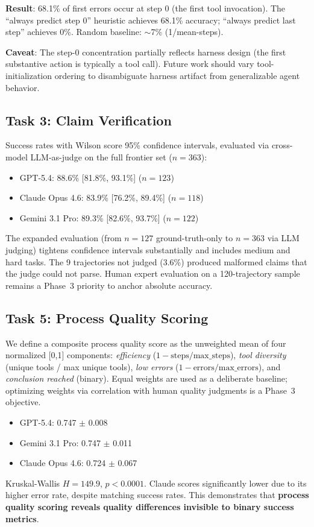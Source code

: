 \documentclass{article}
\begin{document}
\textbf{Result}: 68.1\% of first errors occur at step 0 (the first tool invocation). The ``always predict step 0'' heuristic achieves 68.1\% accuracy; ``always predict last step'' achieves 0\%. Random baseline: ${\sim}$7\% (1/mean-steps).

\textbf{Caveat}: The step-0 concentration partially reflects harness design (the first substantive action is typically a tool call). Future work should vary tool-initialization ordering to disambiguate harness artifact from generalizable agent behavior.

\subsection{Task 3: Claim Verification}

Success rates with Wilson score 95\% confidence intervals, evaluated via cross-model LLM-as-judge on the full frontier set ($n{=}363$):
\begin{itemize}
\item GPT-5.4: 88.6\% [81.8\%, 93.1\%] ($n{=}123$)
\item Claude Opus 4.6: 83.9\% [76.2\%, 89.4\%] ($n{=}118$)
\item Gemini 3.1 Pro: 89.3\% [82.6\%, 93.7\%] ($n{=}122$)
\end{itemize}

The expanded evaluation (from $n{=}127$ ground-truth-only to $n{=}363$ via LLM judging) tightens confidence intervals substantially and includes medium and hard tasks. The 9 trajectories not judged (3.6\%) produced malformed claims that the judge could not parse. Human expert evaluation on a 120-trajectory sample remains a Phase~3 priority to anchor absolute accuracy.

\subsection{Task 5: Process Quality Scoring}

We define a composite process quality score as the unweighted mean of four normalized [0,1] components: \emph{efficiency} ($1 - \text{steps}/\text{max\_steps}$), \emph{tool diversity} (unique tools / max unique tools), \emph{low errors} ($1 - \text{errors}/\text{max\_errors}$), and \emph{conclusion reached} (binary). Equal weights are used as a deliberate baseline; optimizing weights via correlation with human quality judgments is a Phase~3 objective.
\begin{itemize}
\item GPT-5.4: 0.747 $\pm$ 0.008
\item Gemini 3.1 Pro: 0.747 $\pm$ 0.011
\item Claude Opus 4.6: 0.724 $\pm$ 0.067
\end{itemize}
Kruskal-Wallis $H{=}149.9$, $p{<}0.0001$. Claude scores significantly lower due to its higher error rate, despite matching success rates. This demonstrates that \textbf{process quality scoring reveals quality differences invisible to binary success metrics}.
\end{document}
